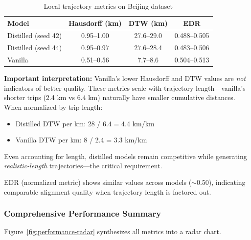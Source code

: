 \begin{table}[h]
\centering
\caption{Local trajectory metrics on Beijing dataset}
\label{tab:local-results}
\small
\begin{tabular}{lccc}
\toprule
\textbf{Model} & \textbf{Hausdorff (km)} & \textbf{DTW (km)} & \textbf{EDR} \\
\midrule
Distilled (seed 42) & 0.95--1.00 & 27.6--29.0 & 0.488--0.505 \\
Distilled (seed 44) & 0.95--0.97 & 27.6--28.4 & 0.483--0.506 \\
Vanilla & 0.51--0.56 & 7.7--8.6 & 0.504--0.513 \\
\bottomrule
\end{tabular}
\end{table}

\textbf{Important interpretation:} Vanilla's lower Hausdorff and DTW values are \emph{not} indicators of better quality. These metrics scale with trajectory length—vanilla's shorter trips (2.4 km vs 6.4 km) naturally have smaller cumulative distances. When normalized by trip length:

\begin{itemize}[noitemsep,topsep=0pt]
\item Distilled DTW per km: 28 / 6.4 = 4.4 km/km
\item Vanilla DTW per km: 8 / 2.4 = 3.3 km/km
\end{itemize}

Even accounting for length, distilled models remain competitive while generating \emph{realistic-length} trajectories—the critical requirement.

EDR (normalized metric) shows similar values across models ($\sim$0.50), indicating comparable alignment quality when trajectory length is factored out.

\subsubsection{Comprehensive Performance Summary}

Figure~\ref{fig:performance-radar} synthesizes all metrics into a radar chart.

